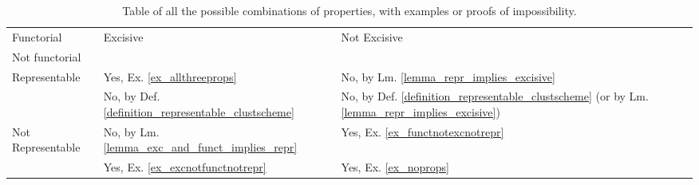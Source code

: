 \begin{table}[H]
    \begin{tabular}{l|ll}
        Functorial                         & \multirow{2}{*}{Excisive}       & \multirow{2}{*}{Not Excisive} \\ \cline{1-1}
        Not functorial                     &                                 &                               \\ \hline
        \multirow{2}{*}{Representable}     & \multicolumn{1}{l|}{Yes, Ex. \ref{ex_allthreeprops}} & No, by Lm. \ref{lemma_repr_implies_excisive}                     \\
                                        & \multicolumn{1}{l|}{No, by Def. \ref{definition_representable_clustscheme}}   & No, by Def. \ref{definition_representable_clustscheme} (or by Lm. \ref{lemma_repr_implies_excisive})            \\ \cline{2-3} 
        \multirow{2}{*}{Not Representable} & \multicolumn{1}{l|}{No, by Lm. \ref{lemma_exc_and_funct_implies_repr}}   & Yes, Ex. \ref{ex_functnotexcnotrepr}                    \\
                                        & \multicolumn{1}{l|}{Yes, Ex. \ref{ex_excnotfunctnotrepr}} & Yes, Ex. \ref{ex_noprops}                   
    \end{tabular}
    \centering
    \label{table_twobytwobytwo}
    \caption{Table of all the possible combinations of properties, with examples or proofs of impossibility.}
\end{table}
